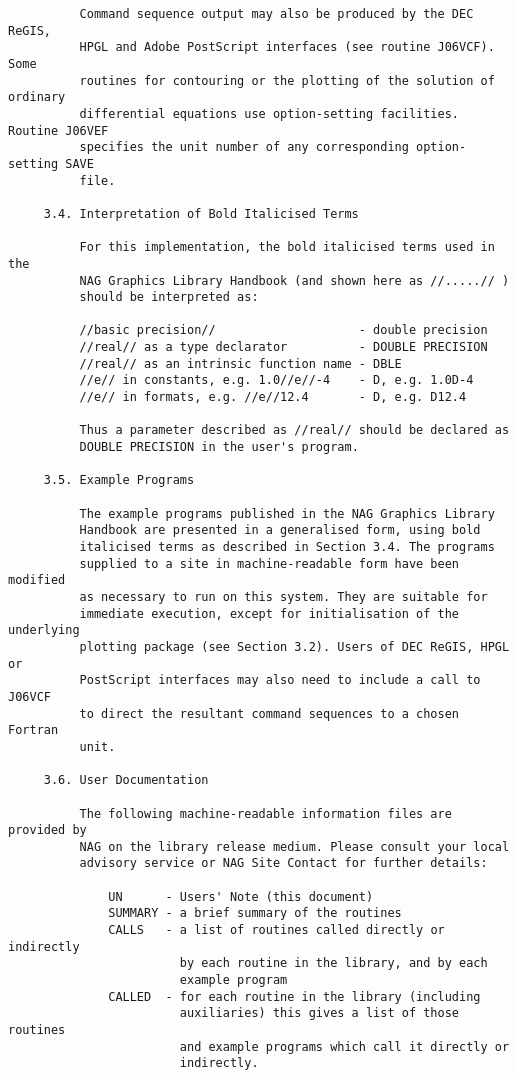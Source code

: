 \begin{verbatim}
          Command sequence output may also be produced by the DEC ReGIS,
          HPGL and Adobe PostScript interfaces (see routine J06VCF). Some
          routines for contouring or the plotting of the solution of ordinary
          differential equations use option-setting facilities. Routine J06VEF
          specifies the unit number of any corresponding option-setting SAVE
          file.
     
     3.4. Interpretation of Bold Italicised Terms
     
          For this implementation, the bold italicised terms used in the
          NAG Graphics Library Handbook (and shown here as //.....// )
          should be interpreted as:

          //basic precision//                    - double precision
          //real// as a type declarator          - DOUBLE PRECISION
          //real// as an intrinsic function name - DBLE
          //e// in constants, e.g. 1.0//e//-4    - D, e.g. 1.0D-4
          //e// in formats, e.g. //e//12.4       - D, e.g. D12.4
     
          Thus a parameter described as //real// should be declared as
          DOUBLE PRECISION in the user's program.
     
     3.5. Example Programs
     
          The example programs published in the NAG Graphics Library
          Handbook are presented in a generalised form, using bold
          italicised terms as described in Section 3.4. The programs
          supplied to a site in machine-readable form have been modified
          as necessary to run on this system. They are suitable for
          immediate execution, except for initialisation of the underlying
          plotting package (see Section 3.2). Users of DEC ReGIS, HPGL or
          PostScript interfaces may also need to include a call to J06VCF
          to direct the resultant command sequences to a chosen Fortran
          unit.
     
     3.6. User Documentation
     
          The following machine-readable information files are provided by
          NAG on the library release medium. Please consult your local
          advisory service or NAG Site Contact for further details:

              UN      - Users' Note (this document)
              SUMMARY - a brief summary of the routines
              CALLS   - a list of routines called directly or indirectly
                        by each routine in the library, and by each
                        example program
              CALLED  - for each routine in the library (including
                        auxiliaries) this gives a list of those routines
                        and example programs which call it directly or
                        indirectly.


\end{verbatim}
